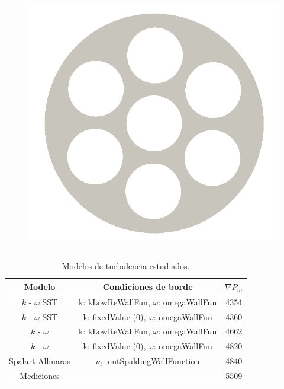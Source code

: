 \documentclass[9pt,mathserif]{beamer}
\begin{document}
{\begin{columns}
    \begin{figure}
      \center
      \includegraphics[width=0.75\linewidth]{figsGEOM/geom_mod_turb.png} %
    \end{figure}
    
    
  \end{columns}
  

  \vspace{0.9cm}
  
   \begin{table}[ht]
        \centering
        \begin{tabular}{c c  c }
            \hline
            \bf Modelo & \bf Condiciones de borde   &  $\nabla P_m$  \\
            \hline
            \hline
            $k$ - $\omega$ SST    & k: kLowReWallFun, $\omega$: omegaWallFun  &  4354\\ %
            $k$ - $\omega$ SST    & k: fixedValue (0), $\omega$: omegaWallFun  &  4360\\ %
            $k$ - $\omega$  & k: kLowReWallFun, $\omega$: omegaWallFun  &  4662 \\ %
            $k$ - $\omega$  & k: fixedValue (0), $\omega$: omegaWallFun  &  4820 \\ %
            \alert{Spalart-Allmaras} & \alert{$\nu_t$: nutSpaldingWallFunction} &  \alert{4840} \\ %
            \hline
            Mediciones &  & 5509 \\
            \hline
        \end{tabular}
        \caption{Modelos de turbulencia estudiados.}
    \end{table}    

}
\end{document}
